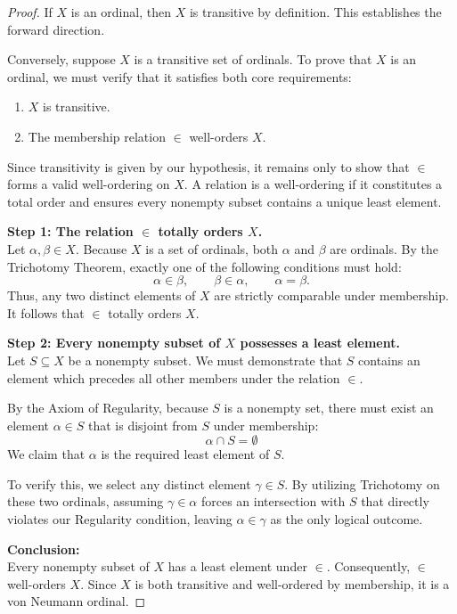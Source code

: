 \documentclass[11pt]{article}
\begin{document}
\begin{proof}
If $X$ is an ordinal, then $X$ is transitive by definition. This establishes the forward direction.

Conversely, suppose $X$ is a transitive set of ordinals. To prove that $X$ is an ordinal, we must verify that it satisfies both core requirements:
\begin{enumerate}[label=(\roman*)]
    \item $X$ is transitive.
    \item The membership relation $\in$ well-orders $X$.
\end{enumerate}
Since transitivity is given by our hypothesis, it remains only to show that $\in$ forms a valid well-ordering on $X$. A relation is a well-ordering if it constitutes a total order and ensures every nonempty subset contains a unique least element.

\medskip
\noindent\textbf{Step 1: The relation $\in$ totally orders $X$.}\\
Let $\alpha, \beta \in X$. Because $X$ is a set of ordinals, both $\alpha$ and $\beta$ are ordinals. By the Trichotomy Theorem, exactly one of the following conditions must hold:
\[
\alpha \in \beta, \qquad \beta \in \alpha, \qquad \alpha = \beta.
\]
Thus, any two distinct elements of $X$ are strictly comparable under membership. It follows that $\in$ totally orders $X$.

\medskip
\noindent\textbf{Step 2: Every nonempty subset of $X$ possesses a least element.}\\
Let $S \subseteq X$ be a nonempty subset. We must demonstrate that $S$ contains an element which precedes all other members under the relation $\in$.

By the Axiom of Regularity, because $S$ is a nonempty set, there must exist an element $\alpha \in S$ that is disjoint from $S$ under membership:
\[
\alpha \cap S = \emptyset
\]
We claim that $\alpha$ is the required least element of $S$. 

\medskip
To verify this, we select any distinct element $\gamma \in S$. By utilizing Trichotomy on these two ordinals, assuming $\gamma \in \alpha$ forces an intersection with $S$ that directly violates our Regularity condition, leaving $\alpha \in \gamma$ as the only logical outcome.


\medskip
\noindent\textbf{Conclusion:}\\
Every nonempty subset of $X$ has a least element under $\in$. Consequently, $\in$ well-orders $X$. Since $X$ is both transitive and well-ordered by membership, it is a von Neumann ordinal.
\end{proof}
\end{document}
